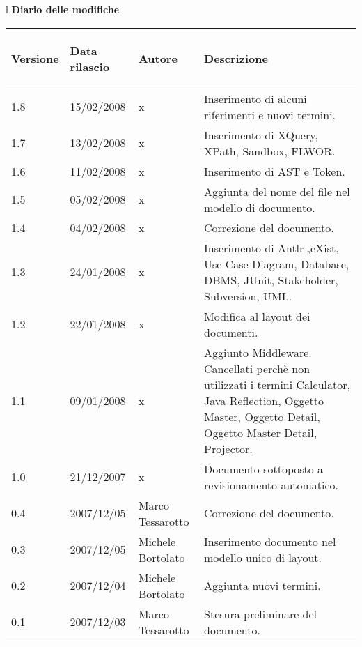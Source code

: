 \begin{center}
\begin{table}[hbtp]
\begin{tabular}{l}
\Large{\textbf{\textsf{Diario delle modifiche}}} \\
\begin{tabular}{|p{}|p{2cm}|p{2.5cm}|p{}|} \hline
\begin{small}Versione\end{small} & \begin{small}Data rilascio\end{small} & \begin{small}Autore\end{small} & \begin{small}Descrizione\end{small} \\ \hline
1.8 & 15/02/2008 & x & Inserimento di alcuni riferimenti e nuovi termini.\\ \hline
1.7 & 13/02/2008 & x & Inserimento di XQuery, XPath, Sandbox, FLWOR.\\ \hline
1.6 & 11/02/2008 & x & Inserimento di AST e Token.\\ \hline
1.5 & 05/02/2008 & x & Aggiunta del nome del file nel modello di documento.\\ \hline
1.4 & 04/02/2008 & x & Correzione del documento.\\ \hline
1.3 & 24/01/2008 & x & Inserimento di Antlr ,eXist, Use Case Diagram, Database, DBMS, JUnit, Stakeholder, Subversion, UML.\\ \hline
1.2 & 22/01/2008 & x & Modifica al layout dei documenti.\\ \hline
1.1 & 09/01/2008 & x & Aggiunto Middleware. Cancellati perch\`e non utilizzati i termini Calculator, Java Reflection, Oggetto Master, Oggetto Detail, Oggetto Master Detail, Projector.\\ \hline
1.0 & 21/12/2007 & x & Documento sottoposto a revisionamento automatico.\\ \hline
0.4 & 2007/12/05 & Marco Tessarotto & Correzione del documento. \\ \hline
0.3 & 2007/12/05 & Michele Bortolato & Inserimento documento nel modello unico di layout. \\ \hline
0.2 & 2007/12/04 & Michele Bortolato & Aggiunta nuovi termini. \\ \hline
0.1 & 2007/12/03 & Marco Tessarotto & Stesura preliminare del documento. \\ \hline

\end{tabular} \\
\end{tabular}


\end{table}
\end{center}
\newpage
\tableofcontents

